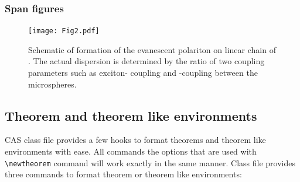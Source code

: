 \documentclass[a4paper,12pt]{article}
\begin{document}
\subsubsection{Span figures}

\begin{vquote}
\begin{figure}
	\centering
	  \texttt{[image: Fig2.pdf]}
	\caption{Schematic of formation of the evanescent polariton on
	linear chain of \PMS. The actual dispersion is determined by 
  the ratio of two coupling parameters such as exciton-\WGM 
  coupling and \WGM-\WGM coupling between the microspheres.}
  \label{FIG:2}
\end{figure}\end{vquote}

\subsection{Theorem and theorem like environments}

CAS class file provides a few hooks to format theorems and
theorem like environments with ease. All commands the
options that are used with \verb+\newtheorem+ command will work
exactly in the same manner. Class file provides three
commands to format theorem or theorem like environments:
\end{document}
